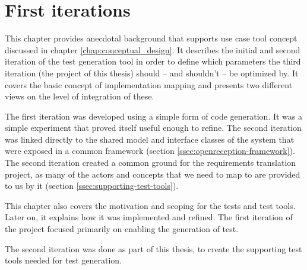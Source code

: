 \chapter{First iterations}
\label{chapter:first-iterations}
This chapter provides anecdotal background that supports use case tool concept discussed in chapter \ref{chap:conceptual_design}. It describes the initial and second iteration of the test generation tool in order to define which parameters the third iteration (the project of this thesis) should -- and shouldn't -- be optimized by. It covers the basic concept of implementation mapping and presents two different views on the level of integration of these.\medskip

\noindent The first iteration was developed using a simple form of code generation. It was a simple experiment that proved itself useful enough to refine. The second iteration was linked directly to the shared model and interface classes of the system that were exposed in a common framework (section \ref{ssec:openreception-framework}). The second iteration created a common ground for the requirements translation project, as many of the actors and concepts that we need to map to are provided to us by it (section \ref{ssec:supporting-test-tools}).\medskip

\noindent This chapter also covers the motivation and scoping for the tests and test tools. Later on, it explains how it was implemented and refined. The first iteration of the project focused primarily on enabling the generation of test.\medskip

\noindent The second iteration was done as part of this thesis, to create the supporting test tools needed for test generation.


